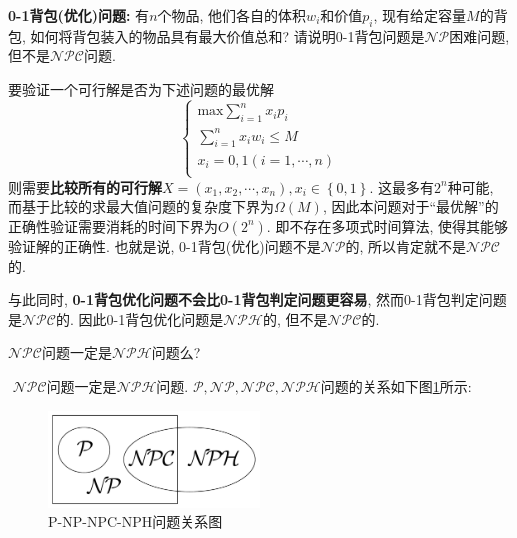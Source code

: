\documentclass{article}
\begin{document}
\begin{homeworkProblem}
	\textbf{0-1背包(优化)问题:} 有$n$个物品, 他们各自的体积$w_i$和价值$p_i$, 现有给定容量$M$的背包, 如何将背包装入的物品具有最大价值总和? 请说明0-1背包问题是$\mathcal{NP}$困难问题, 但不是$\mathcal{NPC}$问题.

	\solution 要验证一个可行解是否为下述问题的最优解
	$$
	\begin{cases}
		\displaystyle \text{max} \sum_{i=1}^n{x_ip_i}\\
		\displaystyle \sum_{i=1}^n{x_iw_i}\le M\\
		x_i=0,1\left( i=1,\cdots ,n \right)\\
	\end{cases}
	$$
	则需要\textbf{比较所有的可行解}$X=(x_1,x_2,\cdots,x_n),x_i\in \left\{ 0,1 \right\}$. 这最多有$2^n$种可能, 而基于比较的求最大值问题的复杂度下界为$\Omega(M)$, 因此本问题对于“最优解”的正确性验证需要消耗的时间下界为$O\left(2^n\right)$. 即不存在多项式时间算法, 使得其能够验证解的正确性. 也就是说, 0-1背包(优化)问题不是$\mathcal{NP}$的, 所以肯定就不是$\mathcal{NPC}$的.
	
	与此同时, \textbf{0-1背包优化问题不会比0-1背包判定问题更容易}, 然而0-1背包判定问题是$\mathcal{NPC}$的. 因此0-1背包优化问题是$\mathcal{NPH}$的, 但不是$\mathcal{NPC}$的.
\end{homeworkProblem}


\begin{homeworkProblem}
	$\mathcal{NPC}$问题一定是$\mathcal{NPH}$问题么?

	\solution \,\,$\mathcal{NPC}$问题一定是$\mathcal{NPH}$问题. $\mathcal{P},\mathcal{NP},\mathcal{NPC},\mathcal{NPH}$问题的关系如下图\ref{fig:P-NP-NPC-NPH问题关系图}所示:
	\begin{figure}[H]
		\centering
		\includegraphics[width=0.5\textwidth]{images/title/P-NP-NPC-NPH问题关系图.pdf}
		\caption{P-NP-NPC-NPH问题关系图}
		\label{fig:P-NP-NPC-NPH问题关系图}
	\end{figure}
\end{homeworkProblem}
\end{document}
